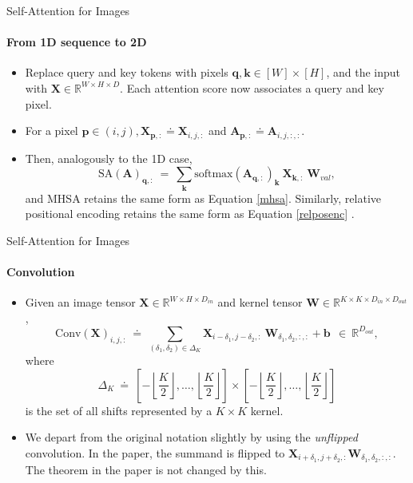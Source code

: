 \documentclass[9pt]{beamer}
\newcommand{\bb}{\mathbb}
\newcommand{\mb}{\bm}
\begin{document}
\begin{frame}{Self-Attention for Images}
\framesubtitle{From 1D sequence to 2D}
\begin{itemize}
\item Replace query and key tokens with pixels $\bm q, \bm k \in [W]\times[H]$, and the input with $\bm X \in \bb R^{W\times H\times D}$. Each attention score now associates a query and key pixel. 

\item For a pixel $\bm p\in (i,j), \bm X_{\bm p,:} \doteq \bm X_{i,j,:}$ and $\bm A_{\bm p, :} \doteq \bm A_{i,j,:,:}$. 

\item Then, analogously to the 1D case,
\begin{equation}
\mathrm{SA}(\mb A)_{\mb q, :} \ = \ \sum_{\mb k} \mathrm{softmax}(\mb A_{\mb q, :})_{\mb k}\ \mb X_{\mb k, :} \ \mb W_{val},
\end{equation}
and MHSA retains the same form as Equation \eqref{mhsa}. Similarly, relative positional encoding retains the same form as Equation \eqref{relposenc} .
\end{itemize}
\end{frame}


\newcommand{\sqbrkt}[1]{\left[#1\right]}
\newcommand{\ktwo}{\left\lfloor\frac K2\right\rfloor}
\begin{frame}{Self-Attention for Images}
\framesubtitle{Convolution}
\begin{itemize}
\item Given an image tensor $\bm X \in \bb R^{W\times H\times D_{in}}$ and kernel tensor $\bm W \in \bb R^{K\times K \times D_{in} \times D_{out}}$,
\begin{equation}
    \mathrm{Conv}(\mb X)_{i,j,:} \ \doteq \ \sum_{(\delta_1, \delta_2) \in \Delta_K} 
    \mb X_{i-\delta_1, j-\delta_2, :}\ \mb W_{\delta_1, \delta_2, :, :} 
    + \mb b \ \ \in \ \mathbb R^{D_{out}},
\end{equation}
where
$$\Delta_K \ \doteq \ \sqbrkt{-\ktwo, \dots, \ktwo} \times \sqbrkt{-\ktwo, \dots, \ktwo}$$
is the set of all shifts represented by a $K\times K$ kernel.

\vspace{.1in}
\item We depart from the original notation slightly by using the {\em unflipped} convolution. In the paper, the summand is flipped to $\bm X_{i+\delta_1, j+\delta_2,:} \bm W_{\delta_1, \delta_2,:,:}$. The theorem in the paper is not changed by this.
\end{itemize}
\end{frame}
\end{document}
